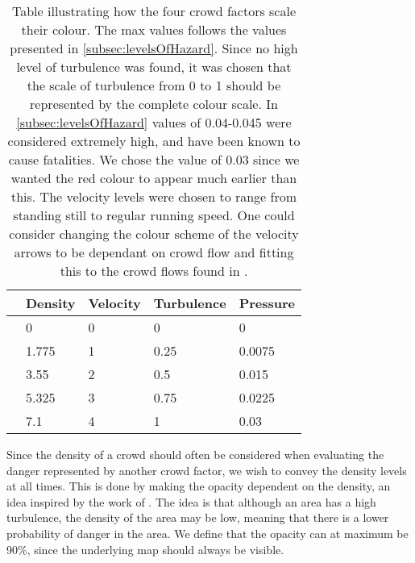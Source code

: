 \begin{table}[htbp]
    \centering
    \begin{tabular}{l l l l l} \toprule
                        & Density & Velocity & Turbulence & Pressure \\ \midrule
    \cellcolor{low}     & 0       & 0        & 0          & 0         \\
    \cellcolor{medium}  & 1.775   & 1        & 0.25       & 0.0075         \\
    \cellcolor{high}    & 3.55    & 2        & 0.5        & 0.015         \\
    \cellcolor{higher}  & 5.325   & 3        & 0.75       & 0.0225         \\
    \cellcolor{highest} & 7.1     & 4        & 1          & 0.03         \\ \bottomrule
    \end{tabular}
    \caption[Crowd factor scale]{Table illustrating how the four crowd factors scale their colour. The max values follows the values presented in \cref{subsec:levelsOfHazard}. Since no high level of turbulence was found, it was chosen that the scale of turbulence from 0 to 1 should be represented by the complete colour scale. In \cref{subsec:levelsOfHazard} values of 0.04-0.045 were considered extremely high, and have been known to cause fatalities. We chose the value of 0.03 since we wanted the red colour to appear much earlier than this. The velocity levels were chosen to range from standing still to regular running speed. One could consider changing the colour scheme of the velocity arrows to be dependant on crowd flow and fitting this to the crowd flows found in .}
    \label{tab:color_scale}
\end{table}

Since the density of a crowd should often be considered when evaluating the danger represented by another crowd factor, we wish to convey the density levels at all times. This is done by making the opacity dependent on the density, an idea inspired by the work of \citet{wirz2012inferring}. The idea is that although an area has a high turbulence, the density of the area may be low, meaning that there is a lower probability of danger in the area. We define that the opacity can at maximum be 90\%, since the underlying map should always be visible.


